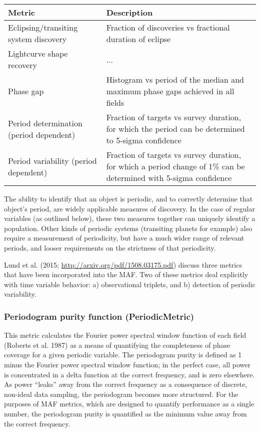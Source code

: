 
\begin{center}
\begin{tabular}{| p{5cm} |p{10cm} |}
\hline Metric & Description\\
\hline
Eclipsing/transiting system discovery & Fraction of discoveries vs fractional duration of eclipse\\
Lightcurve shape recovery & ... \\
Phase gap & Histogram vs period of the median and maximum phase gaps achieved in all fields\\
Period determination (period dependent) & Fraction of targets vs survey duration, for which the period can be determined to 5-sigma confidence\\
Period variability (period dependent) & Fraction of targets vs survey duration, for which a period change of 1\% can be determined with 5-sigma confidence\\
  \hline \end{tabular}
 \end{center}

The ability to identify that an object is periodic, and to correctly determine that object's period, are widely applicable measures of discovery. In the case of regular variables (as outlined below), these two measures together can uniquely identify a population. Other kinds of periodic systems (transiting planets for example) also require a measurement of periodicity, but have a much wider range of relevant periods, and looser requirements on the strictness of that periodicity. 

Lund et al. (2015; \url{http://arxiv.org/pdf/1508.03175.pdf}) discuss three metrics that have been incorporated into the MAF. Two of these metrics deal explicitly with time variable behavior: a) observational triplets, and b) detection of periodic variability. 

\subsubsection{Periodogram purity function (PeriodicMetric)}
This metric calculates the Fourier power spectral window function of each field (Roberts et al. 1987) as a means of quantifying the completeness of phase coverage for a given periodic variable. The periodogram purity is defined as 1 minus the Fourier power spectral window function; in the perfect case, all power is concentrated in a delta function at the correct frequency, and is zero elsewhere. As power ``leaks'' away from the correct frequency as a consequence of discrete, non-ideal data sampling, the periodogram becomes more structured. For the purposes of MAF metrics, which are designed to quantify performance as a single number, the periodogram purity is quantified as the minimum value away from the correct frequency. 

